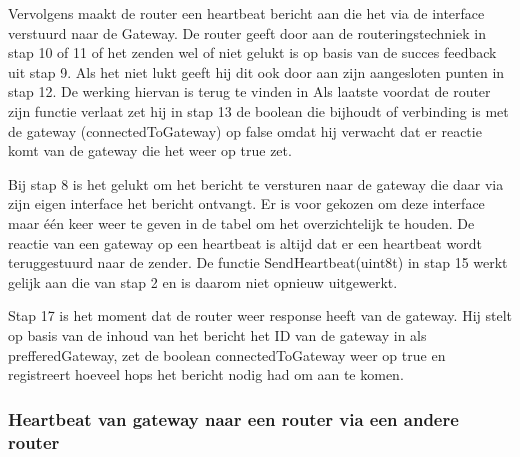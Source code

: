 \documentclass[a4paper, 11pt, oneside]{report}
\begin{document}
Vervolgens maakt de router een heartbeat bericht aan die het via de  interface verstuurd naar de Gateway.
De router geeft door aan de routeringstechniek in stap 10 of 11 of het zenden wel of niet gelukt is op basis van de succes feedback uit stap 9.
Als het niet lukt geeft hij dit ook door aan zijn aangesloten punten in stap 12. 
De werking hiervan is terug te vinden in 
Als laatste voordat de router zijn functie verlaat zet hij in stap 13 de boolean die bijhoudt of verbinding is met de gateway (connectedToGateway) op false omdat hij verwacht dat er reactie komt van de gateway die het weer op true zet.

Bij stap 8 is het gelukt om het bericht te versturen naar de gateway die daar via zijn eigen  interface het bericht ontvangt.
Er is voor gekozen om deze interface maar één keer weer te geven in de tabel om het overzichtelijk te houden.
De reactie van een gateway op een heartbeat is altijd dat er een heartbeat wordt teruggestuurd naar de zender. 
De functie SendHeartbeat(uint8\textunderscore t) in stap 15 werkt gelijk aan die van stap 2 en is daarom niet opnieuw uitgewerkt.

Stap 17 is het moment dat de router weer response heeft van de gateway.
Hij stelt op basis van de inhoud van het bericht het ID van de gateway in als prefferedGateway, zet de boolean connectedToGateway weer op true en registreert hoeveel hops het bericht nodig had om aan te komen.

\subsubsection{Heartbeat van gateway naar een router via een andere router}
\label{DetailedDesign:Communicatie:sequence:heartbeatgateway->router->router}
\end{document}
